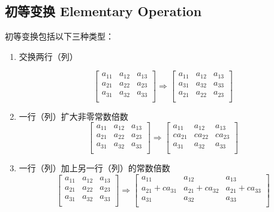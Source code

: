 
\subsection{初等变换 Elementary Operation}
初等变换包括以下三种类型：

\begin{enumerate}
\item 交换两行（列）

\begin{equation}
\left[
    \begin{array}{ccc}
        a_{11} & a_{12} & a_{13}\\
        a_{21} & a_{22} & a_{23}\\
        a_{31} & a_{32} & a_{33}\\
    \end{array}
\right]
\Rightarrow
\left[
    \begin{array}{ccc}
        a_{11} & a_{12} & a_{13}\\
        a_{31} & a_{32} & a_{33}\\
        a_{21} & a_{22} & a_{23}\\
    \end{array}
\right]
\end{equation}

\item 一行（列）扩大非零常数倍数
\begin{equation}
\left[
    \begin{array}{ccc}
        a_{11} & a_{12} & a_{13}\\
        a_{21} & a_{22} & a_{23}\\
        a_{31} & a_{32} & a_{33}\\
    \end{array}
\right]
\Rightarrow
\left[
    \begin{array}{ccc}
        a_{11} & a_{12} & a_{13}\\
        ca_{21} & ca_{22} & ca_{23}\\
        a_{31} & a_{32} & a_{33}\\
    \end{array}
\right]
\end{equation}
\item 一行（列）加上另一行（列）的常数倍数
\begin{equation}
\left[
    \begin{array}{ccc}
        a_{11} & a_{12} & a_{13}\\
        a_{21} & a_{22} & a_{23}\\
        a_{31} & a_{32} & a_{33}\\
    \end{array}
\right]
\Rightarrow
\left[
    \begin{array}{ccc}
        a_{11} & a_{12} & a_{13}\\
        a_{21}+ca_{31} & a_{21}+ca_{32} & a_{21}+ca_{33}\\
        a_{31} & a_{32} & a_{33}\\
    \end{array}
\right]
\end{equation}
\end{enumerate}

